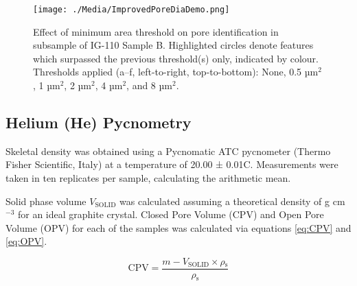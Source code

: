\documentclass[3p,twocolumn]{elsarticle}
\begin{document}
\begin{table}
  \centering
  \caption{Effect of different pore area thresholds on IG-110 Sample B, showing the resulting pore count, average size, total area, and estimated channel porosity.}
  \label{tab:thresholdsandvariations}
\end{table}

\begin{figure}[!htbp]
    \centering
    \texttt{[image: ./Media/ImprovedPoreDiaDemo.png]}
    \caption{Effect of minimum area threshold on pore identification in subsample of IG-110 Sample B. Highlighted circles denote features which surpassed the previous threshold(s) only, indicated by colour. Thresholds applied (a–f, left-to-right, top-to-bottom): None, 0.5 µm\(^2\), 1 µm\(^2\), 2 µm\(^2\), 4 µm\(^2\), and 8 µm\(^2\).}
    \label{fig:improvedporediademo}
\end{figure}

\subsection{Helium (He) Pycnometry}
	
Skeletal density was obtained using a Pycnomatic ATC pycnometer (Thermo Fisher
Scientific, Italy) at a temperature of 20.00 ± 0.01\textdegree{}C. Measurements
were taken in ten replicates per sample, calculating the arithmetic mean.

Solid phase volume $V_{\mathrm{SOLID}}$ was calculated assuming a theoretical
density of  g cm$^{-3}$ for an ideal graphite crystal. Closed Pore Volume
(CPV) and Open Pore Volume (OPV) for each of the samples was calculated via
equations \ref{eq:CPV} and \ref{eq:OPV}.

\begin{equation}
\mathrm{CPV} = \frac{m - V_{\mathrm{SOLID}} \times \rho{_\mathrm{s}}}{\rho{_\mathrm{s}}} 	\label{eq:CPV} 
\end{equation}
\end{document}
